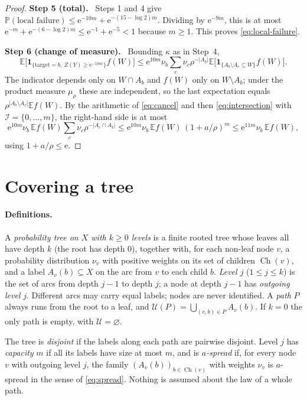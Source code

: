 \documentclass[11pt]{article}
\numberwithin{equation}{section}
\newcommand{\PP}{\mathbb P}
\newcommand{\EE}{\mathbb E}
\newcommand{\ind}{\mathbf 1}
\newcommand{\UU}{\mathcal U}
\newcommand{\ch}{\operatorname{Ch}}
\newcommand{\ee}{\mathrm e}
\newcommand{\step}[1]{\par\smallskip\noindent\textbf{Step #1.}\ }
\begin{document}
\begin{proof}
\step{5 (total)} Steps 1 and 4 give
$\PP(\text{local failure})\le\ee^{-10m}+\ee^{-(15-\log2)m}$. Dividing by
$\ee^{-9m}$, this is at most $\ee^{-m}+\ee^{-(6-\log2)m}\le
\ee^{-1}+\ee^{-5}<1$ because $m\ge1$. This proves
\eqref{eq:local-failure}.

\step{6 (change of measure)} Bounding $\kappa$ as in Step~4,
\[
 \EE\bigl[\ind_{\{\mathrm{target}=b,\ Z(Y)\ge\ee^{-10m}\}}f(W)\bigr]
 \le\ee^{10m}\nu_b\sum_c\nu_c\rho^{-|A_b|}
   \EE\bigl[\ind_{\{A_b\setminus A_c\subseteq W\}}f(W)\bigr].
\]
The indicator depends only on $W\cap A_b$ and $f(W)$ only on
$W\setminus A_b$; under the product measure $\mu_\rho$ these are
independent, so the last expectation equals
$\rho^{|A_b\setminus A_c|}\EE f(W)$. By the arithmetic of
\eqref{eq:cancel} and then \eqref{eq:intersection} with
$\mathcal I=\{0,\ldots,m\}$, the right-hand side is at most
\[
 \ee^{10m}\nu_b\,\EE f(W)\sum_c\nu_c\rho^{-|A_c\cap A_b|}
 \le\ee^{10m}\nu_b\,\EE f(W)\,(1+a/\rho)^m
 \le\ee^{11m}\nu_b\,\EE f(W),
\]
using $1+a/\rho\le\ee$.
\end{proof}

\section{Covering a tree}\label{sec:trees}

\paragraph{Definitions.}
A \emph{probability tree on $X$ with $k\ge0$ levels} is a finite rooted
tree whose leaves all have depth $k$ (the root has depth $0$), together
with, for each non-leaf node $v$, a probability distribution $\nu_v$ with
positive weights on its set of children $\ch(v)$, and a label
$A_v(b)\subseteq X$ on the arc from $v$ to each child $b$. \emph{Level
$j$} ($1\le j\le k$) is the set of arcs from depth $j-1$ to depth $j$; a
node at depth $j-1$ has \emph{outgoing level} $j$. Different arcs may
carry equal labels; nodes are never identified. A \emph{path} $P$ always
runs from the root to a leaf, and
$\UU(P)=\bigcup_{(v,b)\in P}A_v(b)$. If $k=0$ the only path is empty, with
$\UU=\varnothing$.

The tree is \emph{disjoint} if the labels along each path are pairwise
disjoint. Level $j$ has \emph{capacity} $m$ if all its labels have size at
most $m$, and is \emph{$a$-spread} if, for every node $v$ with outgoing
level $j$, the family $(A_v(b))_{b\in\ch(v)}$ with weights $\nu_v$ is
$a$-spread in the sense of \eqref{eq:spread}. Nothing is assumed about the
law of a whole path.
\end{document}
